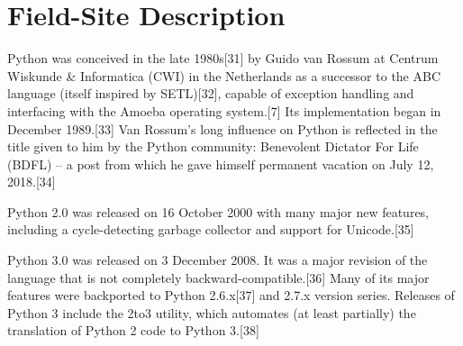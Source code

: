 \documentclass[conference]{IEEEtran} %
\begin{document}
    \section{Field-Site Description}  
    
Python was conceived in the late 1980s[31] by Guido van Rossum at Centrum Wiskunde & Informatica (CWI) in the Netherlands as a successor to the ABC language (itself inspired by SETL)[32], capable of exception handling and interfacing with the Amoeba operating system.[7] Its implementation began in December 1989.[33] Van Rossum's long influence on Python is reflected in the title given to him by the Python community: Benevolent Dictator For Life (BDFL) – a post from which he gave himself permanent vacation on July 12, 2018.[34]

Python 2.0 was released on 16 October 2000 with many major new features, including a cycle-detecting garbage collector and support for Unicode.[35]

Python 3.0 was released on 3 December 2008. It was a major revision of the language that is not completely backward-compatible.[36] Many of its major features were backported to Python 2.6.x[37] and 2.7.x version series. Releases of Python 3 include the 2to3 utility, which automates (at least partially) the translation of Python 2 code to Python 3.[38]
\end{document}
